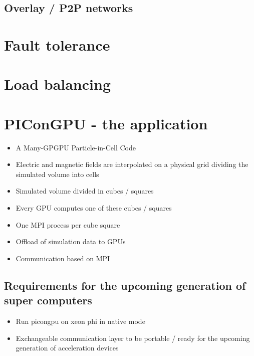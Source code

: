 \subsection{Overlay / P2P networks}
\section{Fault tolerance}
\section{Load balancing}

\section{PIConGPU - the application}
\label{sec:picongpu}
\begin{itemize}
  \item A Many-GPGPU Particle-in-Cell Code
  \item Electric and magnetic fields are interpolated on a physical
    grid dividing the simulated volume into cells
  \item Simulated volume divided in cubes / squares
  \item Every GPU computes one of these cubes / squares
  \item One MPI process per cube square
  \item Offload of simulation data to GPUs
  \item Communication based on MPI
\end{itemize}

\subsection{Requirements for the upcoming generation of super computers}
\begin{itemize}
\item Run picongpu on xeon phi in native mode
\item Exchangeable communication layer to be portable / ready  for the upcoming
  generation of acceleration devices
\end{itemize}

